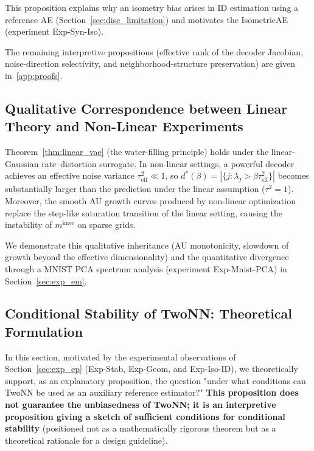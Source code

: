 \documentclass[make,article,submit,pdftex,moreauthors]{Definitions/mdpi}
\newcommand{\mknee}{m^{\mathrm{knee}}}
\begin{document}
This proposition explains why an isometry bias arises in ID estimation using a reference
AE (Section~\ref{sec:disc_limitation}) and motivates the IsometricAE
(experiment Exp-Syn-Iso).

The remaining interpretive propositions (effective rank of the decoder Jacobian,
noise-direction selectivity, and neighborhood-structure preservation) are given
in~\ref{app:proofs}.

\subsection{Qualitative Correspondence between Linear Theory and Non-Linear Experiments}\label{sec:theory_bridge}

Theorem~\ref{thm:linear_vae} (the water-filling principle) holds under the
linear-Gaussian rate--distortion surrogate.
In non-linear settings, a powerful decoder achieves an effective noise variance
$\tau^2_\mathrm{eff} \ll 1$, so
$d^*(\beta) = |\{j : \lambda_j > \beta\tau^2_\mathrm{eff}\}|$ becomes substantially
larger than the prediction under the linear assumption ($\tau^2=1$).
Moreover, the smooth AU growth curves produced by non-linear optimization replace the
step-like saturation transition of the linear setting, causing the instability of
$\mknee$ on sparse grids.

We demonstrate this qualitative inheritance (AU monotonicity, slowdown of growth beyond
the effective dimensionality) and the quantitative divergence through a MNIST PCA
spectrum analysis (experiment Exp-Mnist-PCA) in Section~\ref{sec:exp_em}.

\subsection{Conditional Stability of TwoNN: Theoretical Formulation}\label{sec:theory_stability}

In this section, motivated by the experimental observations of
Section~\ref{sec:exp_ep} (Exp-Stab, Exp-Geom, and Exp-Iso-ID),
we theoretically support, as an explanatory proposition, the question
"under what conditions can TwoNN be used as an auxiliary reference estimator?"
\textbf{This proposition does not guarantee the unbiasedness of TwoNN;
it is an interpretive proposition giving a sketch of sufficient conditions for
conditional stability}
(positioned not as a mathematically rigorous theorem but as a theoretical rationale for
a design guideline).
\end{document}
